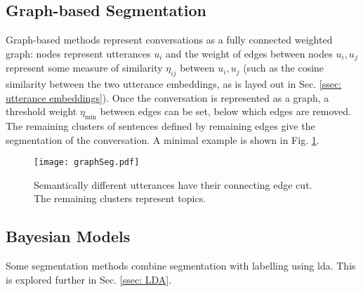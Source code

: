     \subsection{Graph-based Segmentation} 
    Graph-based methods represent conversations as a fully connected weighted graph: nodes represent \glspl{utterance} $u_i$ and the weight of edges between nodes $u_i, u_j$ represent some measure of similarity $\eta_{ij}$ between $u_i, u_j$ (such as the cosine similarity between the two \gls{utterance} \glspl{embedding}, as is layed out in Sec. \ref{ssec: utterance embeddings}). Once the conversation is represented as a graph, a threshold weight $\eta_{\text{min}}$ between edges can be set, below which edges are removed. The remaining clusters of sentences defined by remaining edges give the segmentation of the conversation.\cite{malioutov2006minimum} A minimal example is shown in Fig. \ref{fig: graph seg}.
    
    \begin{figure}[ht]
    \centering
    \texttt{[image: graphSeg.pdf]}
    \caption{Semantically different \glspl{utterance} have their connecting edge cut. The remaining clusters represent topics.\label{fig: graph seg}}
    \end{figure}
     
    \subsection{Bayesian Models}
    Some segmentation methods\cite{eisenstein2008bayesian, purver2006unsupervised, nguyen2012sits} combine segmentation with labelling using \gls{lda}. This is explored further in Sec. \ref{ssec: LDA}.